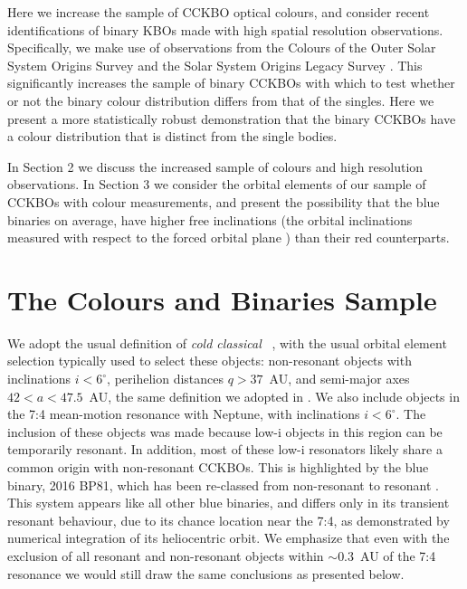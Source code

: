 \documentclass[twocolumn]{aastex63}
\newcommand{\coldclassical}{{\it cold classical}}
\begin{document}
Here we increase the sample of CCKBO optical colours, and consider recent identifications of binary KBOs made with high spatial resolution observations. Specifically, we make use of observations from the Colours of the Outer Solar System Origins Survey \citep[Col-OSSOS;][]{Schwamb2019} and the Solar System Origins Legacy Survey \citep[SSOLS;][]{Parker2020DPS, Benecchi2020DPS}. This significantly increases the sample of binary CCKBOs with which to test whether or not the binary colour distribution differs from that of the singles. Here we present a  more statistically robust demonstration that the binary CCKBOs have a colour distribution that is distinct from the single bodies.

In Section 2 we discuss the increased sample of colours and high resolution observations. In Section 3 we consider the orbital elements of our sample of CCKBOs with colour measurements, and present the possibility that the blue binaries on average, have higher free inclinations (the orbital inclinations  measured with respect to the forced orbital plane \citep{vanLaerhoven2019}) than their red counterparts.

\section{The Colours and Binaries Sample}
We adopt the usual definition of \coldclassical~ \citep[eg.][]{Elliot2005,Gladman2008}, with the usual orbital element selection typically used to select these objects: non-resonant objects with inclinations $i<6^\circ$, perihelion distances $q>37$~AU, and semi-major axes $42<a<47.5$~AU, the same definition we adopted in \citet{Fraser2017}. We also include objects in the 7:4 mean-motion resonance with Neptune, with inclinations $i<6^\circ$. The inclusion of these objects was made because low-i objects in this region can be temporarily resonant. In addition, most of these low-i resonators likely share a common origin with non-resonant CCKBOs. This is highlighted by the blue binary, 2016 BP81, which has been re-classed from non-resonant \citep{Bannister2016} to resonant \citep{Bannister2018}. This system  appears like all other blue binaries, and differs only in its transient resonant behaviour, due to its chance location near the 7:4, as demonstrated by numerical integration of its heliocentric orbit. We emphasize that even with the exclusion of all resonant and non-resonant objects within $\sim0.3$~AU of the 7:4 resonance we would still draw the same conclusions as presented below.
\end{document}
